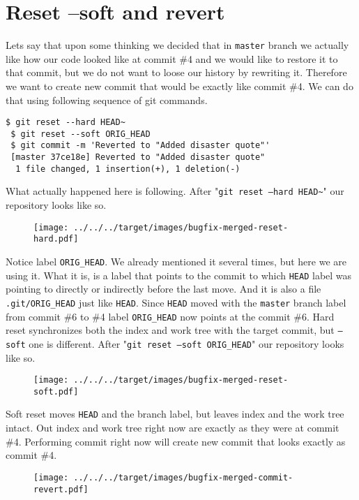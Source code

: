 \documentclass{article}
\theoremstyle{definition}
\begin{document}
        \section{Reset --soft and revert}
        Lets say that upon some thinking we decided that in \texttt{master} branch we actually like how our code looked
        like at commit \#4 and we would like to restore it to that commit, but we do not want to loose our history by
        rewriting it. Therefore we want to create new commit that would be exactly like commit \#4. We can do that using
        following sequence of git commands.
        \begin{Verbatim}[frame=single]
 $ git reset --hard HEAD~
 $ git reset --soft ORIG_HEAD
 $ git commit -m 'Reverted to "Added disaster quote"'
 [master 37ce18e] Reverted to "Added disaster quote"
  1 file changed, 1 insertion(+), 1 deletion(-)
        \end{Verbatim}
        What actually happened here is following. After "\texttt{git reset --hard HEAD\textasciitilde}" our repository
        looks like so.
        \begin{figure}[h]
        \centering\texttt{[image: ../../../target/images/bugfix-merged-reset-hard.pdf]}
        \caption{\label{fig:bugfix-merged-reset-hard}}
        \end{figure}

        \noindent Notice label \texttt{ORIG\_HEAD}. We already mentioned it several times, but here we are using it. What it
        is, is a label that points to the commit to which \texttt{HEAD} label was pointing to directly or indirectly
        before the last move. And it is also a file \texttt{.git/ORIG\_HEAD} just like \texttt{HEAD}.
        Since \texttt{HEAD} moved with the \texttt{master} branch label from commit \#6 to \#4
        label \texttt{ORIG\_HEAD} now points at the commit \#6. Hard reset synchronizes both the index and work tree
        with the target commit, but \texttt{--soft} one is different.
        After "\texttt{git reset --soft ORIG\_HEAD}" our repository looks like so.
        \newpage
        \begin{figure}[h]
        \centering\texttt{[image: ../../../target/images/bugfix-merged-reset-soft.pdf]}
        \caption{\label{fig:bugfix-merged-reset-soft}}
        \end{figure}

        \noindent Soft reset moves \texttt{HEAD} and the branch label, but leaves index and the work tree intact. Out
        index and work tree right now are exactly as they were at commit \#4. Performing commit right now will create
        new commit that looks exactly as commit \#4.
        \begin{figure}[h]
        \centering\texttt{[image: ../../../target/images/bugfix-merged-commit-revert.pdf]}
        \caption{\label{fig:bugfix-merged-commit-revert}}
        \end{figure}
\end{document}
